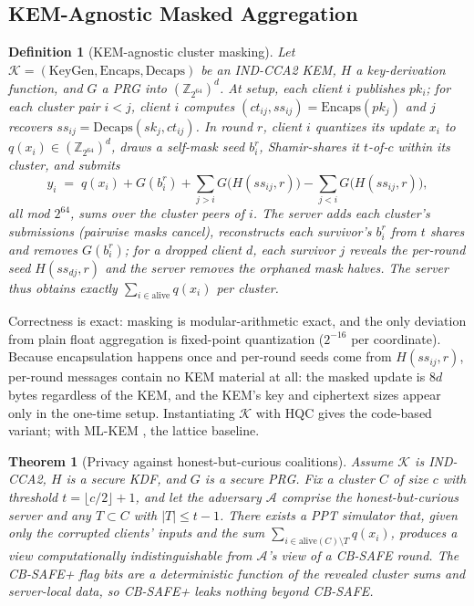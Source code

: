 \documentclass[conference]{IEEEtran}
\newtheorem{definition}{Definition}
\newtheorem{theorem}{Theorem}
\begin{document}
\subsection{KEM-Agnostic Masked Aggregation}
\begin{definition}[KEM-agnostic cluster masking]\label{def:kem}
Let $\mathcal{K}=(\mathrm{KeyGen},\mathrm{Encaps},\mathrm{Decaps})$ be an IND-CCA2
KEM, $H$ a key-derivation function, and $G$ a PRG into $(\mathbb{Z}_{2^{64}})^d$.
At setup, each client $i$ publishes $pk_i$; for each cluster pair $i<j$, client $i$
computes $(ct_{ij}, ss_{ij})=\mathrm{Encaps}(pk_j)$ and $j$ recovers
$ss_{ij}=\mathrm{Decaps}(sk_j, ct_{ij})$. In round $r$, client $i$ quantizes its
update $x_i$ to $q(x_i)\in(\mathbb{Z}_{2^{64}})^d$, draws a self-mask seed $b_i^r$,
Shamir-shares it $t$-of-$c$ within its cluster, and submits
\[
y_i \;=\; q(x_i) + G(b_i^r) + \textstyle\sum_{j>i} G\!\big(H(ss_{ij}, r)\big)
      - \textstyle\sum_{j<i} G\!\big(H(ss_{ij}, r)\big) ,
\]
all mod $2^{64}$, sums over the cluster peers of $i$. The server adds each cluster's
submissions (pairwise masks cancel), reconstructs each survivor's $b_i^r$ from $t$
shares and removes $G(b_i^r)$; for a dropped client $d$, each survivor $j$ reveals
the per-round seed $H(ss_{dj}, r)$ and the server removes the orphaned mask halves.
The server thus obtains exactly $\sum_{i \in \mathrm{alive}} q(x_i)$ per cluster.
\end{definition}

Correctness is exact: masking is modular-arithmetic exact, and the only deviation
from plain float aggregation is fixed-point quantization ($2^{-16}$ per coordinate).
Because encapsulation happens once and per-round seeds come from $H(ss_{ij}, r)$,
per-round messages contain no KEM material at all: the masked update is $8d$ bytes
regardless of the KEM, and the KEM's key and ciphertext sizes appear only in the
one-time setup. Instantiating $\mathcal{K}$ with HQC gives the code-based variant;
with ML-KEM \cite{fips203}, the lattice baseline.

\begin{theorem}[Privacy against honest-but-curious coalitions]\label{thm:priv}
Assume $\mathcal{K}$ is IND-CCA2, $H$ is a secure KDF, and $G$ is a secure PRG. Fix
a cluster $C$ of size $c$ with threshold $t=\lfloor c/2\rfloor+1$, and let the
adversary $\mathcal{A}$ comprise the honest-but-curious server and any $T \subset C$
with $|T| \le t-1$. There exists a PPT simulator that, given only the corrupted
clients' inputs and the sum $\sum_{i \in \mathrm{alive}(C)\setminus T} q(x_i)$,
produces a view computationally indistinguishable from $\mathcal{A}$'s view of a
CB-SAFE round. The CB-SAFE+ flag bits are a deterministic function of the revealed
cluster sums and server-local data, so CB-SAFE+ leaks nothing beyond CB-SAFE.
\end{theorem}
\end{document}
